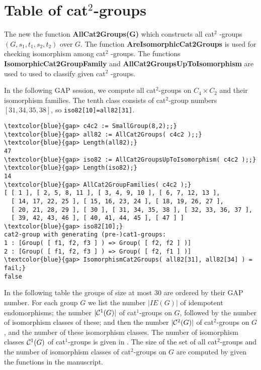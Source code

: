 \documentclass[a4paper,11pt]{article}
\theoremstyle{plain}
\theoremstyle{definition}
\begin{document}
\section{Table of cat$^{2}$-groups}

The new the function \textbf{AllCat2Groups(G)} which constructs all cat$^{2}$%
-groups $(G,s_1,t_1,s_2,t_2)$ over $G$. The function \textbf{%
	AreIsomorphicCat2Groups} is used for checking isomorphism among cat$^{2}$%
-groups. The functions \textbf{IsomorphicCat2GroupFamily} and \textbf{%
	AllCat2GroupsUpToIsomorphism} are used to used to classify given cat$^{2}$%
-groups.

In the following \textsf{GAP} session, we compute all cat$^{2}$-groups on $C_{4}
\times C_{2}$ and their isomorphism families. 
The tenth class consists of cat$^2$-group numbers $[31,34,35,38]$, 
so \texttt{iso82[10]=all82[31]}. 

\begin{Verbatim}[frame=single, fontsize=\small, commandchars=\\\{\}]
\textcolor{blue}{gap> c4c2 := SmallGroup(8,2);;}
\textcolor{blue}{gap> all82 := AllCat2Groups( c4c2 );;}
\textcolor{blue}{gap> Length(all82);}
47
\textcolor{blue}{gap> iso82 := AllCat2GroupsUpToIsomorphism( c4c2 );;}
\textcolor{blue}{gap> Length(iso82);}
14
\textcolor{blue}{gap> AllCat2GroupFamilies( c4c2 );}
[ [ 1 ], [ 2, 5, 8, 11 ], [ 3, 4, 9, 10 ], [ 6, 7, 12, 13 ], 
  [ 14, 17, 22, 25 ], [ 15, 16, 23, 24 ], [ 18, 19, 26, 27 ], 
  [ 20, 21, 28, 29 ], [ 30 ], [ 31, 34, 35, 38 ], [ 32, 33, 36, 37 ], 
  [ 39, 42, 43, 46 ], [ 40, 41, 44, 45 ], [ 47 ] ]
\textcolor{blue}{gap> iso82[10];}
cat2-group with generating (pre-)cat1-groups:
1 : [Group( [ f1, f2, f3 ] ) => Group( [ f2, f2 ] )]
2 : [Group( [ f1, f2, f3 ] ) => Group( [ f2, f1 ] )]
\textcolor{blue}{gap> IsomorphismCat2Groups( all82[31], all82[34] ) = fail;}
false
\end{Verbatim}

In the following table the groups of size at most $30$ are ordered by their
\textsf{GAP} number. 
For each group $G$ we list the number $|IE(G)|$ of idempotent endomorphisms; 
the number $|\mathcal{C}^1(G)|$ of cat$^1$-groups on $G$, 
followed by the number of isomorphism classes of these; 
and then the number $|\mathcal{C}^2(G)|$ of cat$^2$-groups on $G$, 
and the number of these isomorphism classes. 
The number of isomorphism classes $\mathcal{C}^1(G)$ of cat$^{1}$-groups 
is given in \cite{alp2}. 
The size of the set of all cat$^{2}$-groups and the number of isomorphism classes 
of cat$^{2}$-groups on $G$ are computed by given the functions in the manuscript.
\end{document}
